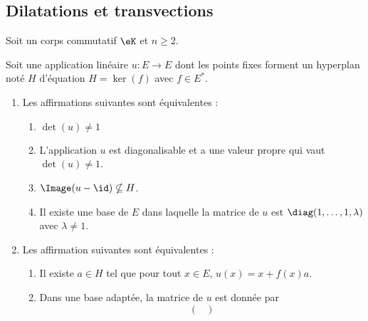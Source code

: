 \subsection{Dilatations et transvections}

Soit un corps commutatif \( \eK\) et \( n\geq 2\).

\begin{theoremDef}     \label{ThoooAZKDooNDcznv}
    Soit une application linéaire \( u\colon E\to E\) dont les points fixes forment un hyperplan noté \( H\) d'équation \( H=\ker(f)\) avec \( f\in E^*\).
    \begin{enumerate}
        \item     \label{ITEMooGTKRooQSPNoI}
            Les affirmations suivantes sont équivalentes :
            \begin{enumerate}
                \item  \label{ITEMooZHYRooFGKaifi}
                    \( \det(u)\neq 1\)
                \item       \label{ooXKLWooTfUMzV}
                    L'application \( u\) est diagonalisable et a une valeur propre qui vaut \( \det(u)\neq 1\).
                \item       \label{ooMZPTooCLylbh}  
                    \( \Image(u-\id)\nsubseteq H\).
                \item   \label{ITEMooZHYRooFGKaifiv}
                    Il existe une base de \( E\) dans laquelle la matrice de \( u\) est \( \diag(1,\ldots, 1,\lambda)\) avec \( \lambda\neq 1\).
            \end{enumerate}
        \item       \label{ITEMooMSJXooUsLCHx}
            Les affirmation suivantes sont équivalentes :
            \let\oldthenumii\theenumi
            \renewcommand{\theenumii}{\roman{enumii}}
            \begin{enumerate}
                \item       \label{ITEMooRTIEooOoWCFsa}
                    Il existe \( a\in H\) tel que pour tout \( x\in E\), \( u(x)=x+f(x)a\).
                \item       \label{ITEMooRTIEooOoWCFsb}
                    Dans une base adaptée, la matrice de \( u\) est donnée par
                    \begin{equation}        \label{EQooFXBDooTgZwMv}
                        \begin{pmatrix}

\end{pmatrix}
\end{equation}
\end{enumerate}
\end{enumerate}
\end{theoremDef}
